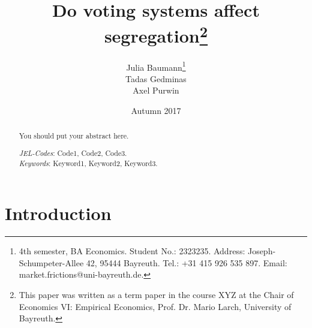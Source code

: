 \documentclass[12pt, a4paper]{article}
\title{{\Large Do voting systems affect segregation\footnote{This paper was written as a term paper in the course XYZ at the Chair of Economics VI: Empirical Economics, Prof. Dr. Mario Larch, University of Bayreuth.}}\\
\vspace{3mm}{\Large Term Paper, Software Engineering for Economists}%
}
\author{Julia Baumann\footnote{4th semester, BA Economics. Student No.: 2323235. Address: Joseph-Schumpeter-Allee 42, 95444 Bayreuth. Tel.: +31 415 926 535 897. Email: market.frictions@uni-bayreuth.de.}\\ Tadas Gedminas\\Axel Purwin}
\date{Autumn 2017}
\begin{document}
\maketitle \thispagestyle{empty}

\begin{abstract}

\setlength{\baselineskip}{10.5pt} 

\vspace{0.5cm} 
\noindent You should put your abstract here. 
\vspace{0.5cm} 

{\normalsize \noindent \emph{JEL-Codes}:  Code1, Code2, Code3.\\ %
\emph{Keywords}: Keyword1, Keyword2, Keyword3.} %
\end{abstract}

\newpage

\thispagestyle{empty}
\tableofcontents
\newpage

\newpage
\thispagestyle{empty}
\listoftables


\newpage
\thispagestyle{empty}
\listoffigures


\newpage


\setcounter{page}{1}%


\section{\label{sec_intro}Introduction}

\end{document}
